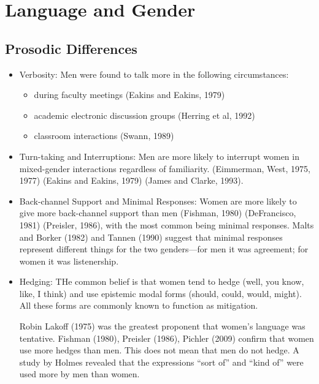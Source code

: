 \documentclass[../main.tex]{subfiles}
\begin{document}
    \section{Language and Gender}
        \subsection{Prosodic Differences}
            \begin{itemize}
                \item Verbosity: Men were found to talk more in the following circumstances: \begin{itemize}
                    \item during faculty meetings (Eakins and Eakins, 1979)
                    \item academic electronic discussion groups (Herring et al, 1992)
                    \item classroom interactions (Swann, 1989)
                \end{itemize}
                \item Turn-taking and Interruptions: Men are more likely to interrupt women in mixed-gender interactions regardless of familiarity. (Eimmerman, West, 1975, 1977) (Eakins and Eakins, 1979) (James and Clarke, 1993).
                \item Back-channel Support and Minimal Responses: Women are more likely to give more back-channel support than men (Fishman, 1980) (DeFrancisco, 1981) (Preisler, 1986), with the most common being minimal responses.
                Malts and Borker (1982) and Tannen (1990) suggest that minimal responses represent different things for the two genders---for men it was agreement; for women it was listenership.
                \item Hedging: THe common belief is that women tend to hedge (well, you know, like, I think) and use epistemic modal forms (should, could, would, might). All these forms are commonly known to function as mitigation. \par
                Robin Lakoff (1975) was the greatest proponent that women's language was tentative. Fishman (1980), Preisler (1986), Pichler (2009) confirm that women use more hedges than men. This does not mean that men do not hedge. A study by Holmes revealed that the expressions ``sort of'' and ``kind of'' were used more by men than women.
            \end{itemize}
\end{document}
